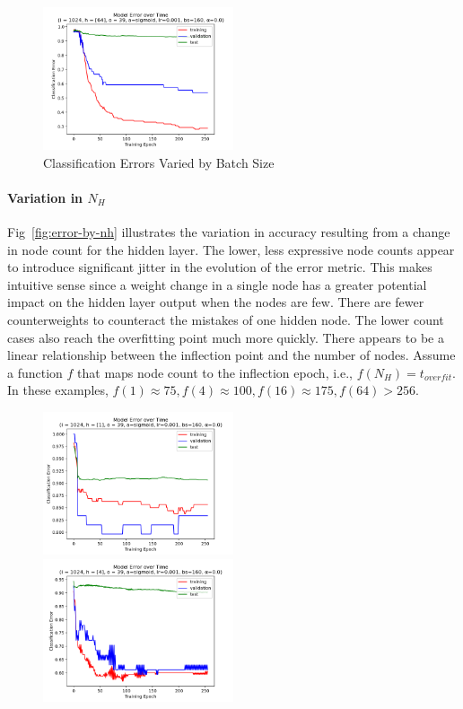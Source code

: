 \documentclass[10pt,epsf]{article}
\begin{document}
{{\begin{figure}[h]
      \includegraphics[width=0.5\textwidth]{./img/64-0.001-160-0-sigmoid-1/error-255.png}
      \caption{Classification Errors Varied by Batch Size}
      \label{fig:error-by-b}
    \end{figure}
    \paragraph{Variation in $N_H$}{
      Fig~\ref{fig:error-by-nh} illustrates the variation in accuracy resulting from a change in
      node count for the hidden layer. The lower, less expressive node counts appear to
      introduce significant jitter in the evolution of the error metric. This makes intuitive
      sense since a weight change in a single node has a greater potential impact on the hidden
      layer output when the nodes are few. There are fewer counterweights to counteract the mistakes
      of one hidden node. The lower count cases also reach the overfitting point much more quickly.
      There appears to be a linear relationship between the inflection point and the number of
      nodes. Assume a function $f$ that maps node count to the inflection epoch, i.e.,
      $f(N_H) = t_{overfit}$.
      In these examples, $f(1) \approx 75, f(4) \approx 100, f(16) \approx 175, f(64) > 256$.
    }
    \begin{figure}[h]
      \includegraphics[width=0.5\textwidth]{./img/1-0.001-160-0-sigmoid-1/error-255.png}
      \includegraphics[width=0.5\textwidth]{./img/4-0.001-160-0-sigmoid-1/error-255.png}

\end{figure}}}
\end{document}
